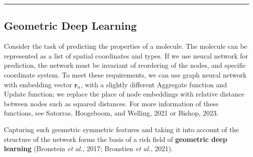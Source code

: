 \documentclass{article}
\begin{document}
        \begin{algorithm}[H]
            \DontPrintSemicolon
            \caption{General massage passing neural network}


            \BlankLine
            \hrule


        
        \end{algorithm}

    \subsection{Geometric Deep Learning}
        Consider the task of predicting the properties of a molecule. The molecule can be represented as a list of
        spatial coordinates and types. If we use neural network for prediction, the network must be invariant of reordering of the nodes, and specific coordinate system.
        To meet these requirements, we can use graph neural network with embedding vector $\textbf{r}_n$, with a slightly different Aggregate function and Update function;
        we replace the place of node embeddings with relative distance between nodes such as squared distances. For more information of these functions, see Satorras, Hoogeboom, and Welling, 2021 or Bishop, 2023.
        
        Capturing such geometric symmetric features and taking it into account of the structure of the network forms the basis of a rich field of
        \textbf{geometric deep learning} (Bronstein \emph{et al.}, 2017; Bronstien \emph{et al.}, 2021).
\end{document}
